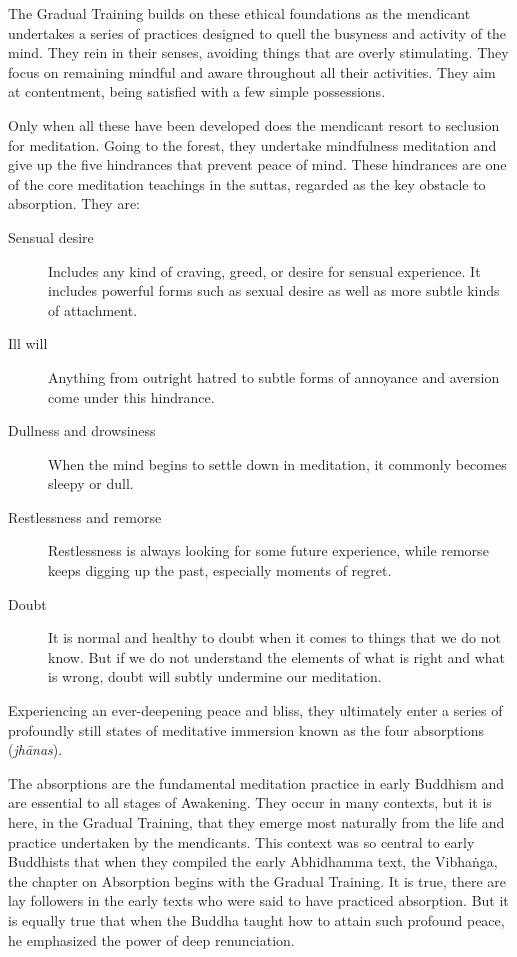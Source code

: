 \documentclass[12pt,openany]{book}%
\begin{document}
The Gradual Training builds on these ethical foundations as the mendicant undertakes a series of practices designed to quell the busyness and activity of the mind. They rein in their senses, avoiding things that are overly stimulating. They focus on remaining mindful and aware throughout all their activities. They aim at contentment, being satisfied with a few simple possessions.

Only when all these have been developed does the mendicant resort to seclusion for meditation. Going to the forest, they undertake mindfulness meditation and give up the five hindrances that prevent peace of mind. These hindrances are one of the core meditation teachings in the suttas, regarded as the key obstacle to absorption. They are:

\begin{description}%
\item[Sensual desire] Includes any kind of craving, greed, or desire for sensual experience. It includes powerful forms such as sexual desire as well as more subtle kinds of attachment.%
\item[Ill will] Anything from outright hatred to subtle forms of annoyance and aversion come under this hindrance.%
\item[Dullness and drowsiness] When the mind begins to settle down in meditation, it commonly becomes sleepy or dull.%
\item[Restlessness and remorse] Restlessness is always looking for some future experience, while remorse keeps digging up the past, especially moments of regret.%
\item[Doubt] It is normal and healthy to doubt when it comes to things that we do not know. But if we do not understand the elements of what is right and what is wrong, doubt will subtly undermine our meditation.%
\end{description}

Experiencing an ever-deepening peace and bliss, they ultimately enter a series of profoundly still states of meditative immersion known as the four absorptions (\textit{\textsanskrit{jhānas}}).

The absorptions are the fundamental meditation practice in early Buddhism and are essential to all stages of Awakening. They occur in many contexts, but it is here, in the Gradual Training, that they emerge most naturally from the life and practice undertaken by the mendicants. This context was so central to early Buddhists that when they compiled the early Abhidhamma text, the \textsanskrit{Vibhaṅga}, the chapter on Absorption begins with the Gradual Training. It is true, there are lay followers in the early texts who were said to have practiced absorption. But it is equally true that when the Buddha taught how to attain such profound peace, he emphasized the power of deep renunciation.
\end{document}
